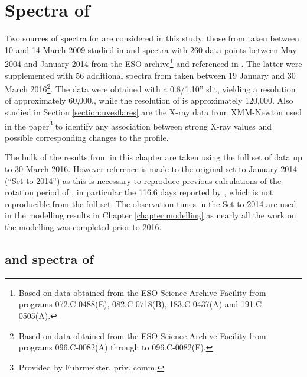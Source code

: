 \chapter{Spectra of \prox}
\protect\label{chapter:proxima}

Two sources of spectra for {\prox} are considered in this study, those from {\uves} taken between 10 and 14 March 2009
studied in \citet{fuhrmeister11} and {\harps} spectra with 260 data points between May 2004 and January 2014 from the
ESO archive\footnote{Based on data obtained from the ESO Science Archive Facility from programs 072.C-0488(E),
  082.C-0718(B), 183.C-0437(A) and 191.C-0505(A).} and referenced in \citet[Table 3]{suarezmascareno15}. The latter were
supplemented with 56 additional spectra from {\harps} taken between 19 January and 30 March 2016\footnote{Based on data obtained
  from the ESO Science Archive Facility from programs 096.C-0082(A) through to 096.C-0082(F).}. The {\uves} data were
obtained with a 0.8/1.10'' slit, yielding a resolution of approximately 60,000., while the resolution of {\harps} is
approximately 120,000. Also studied in Section \ref{section:uvesflares} are the X-ray data from XMM-Newton used in the
\citet{fuhrmeister11} paper\footnote{Provided by Fuhrmeister, priv. comm.} to identify any association between strong
X-ray values and possible corresponding changes to the {\ha} profile.

The bulk of the results from {\harps} in this chapter are taken using the full set of data up to 30 March 2016. However
reference is made to the original set to January 2014 (``Set to 2014'') as this is necessary to reproduce previous
calculations of the rotation period of \prox, in particular the 116.6 days reported by \citet[Table
3]{suarezmascareno15}, which is not reproducible from the full set. The observation times in the Set to 2014 are used in
the modelling results in Chapter \ref{chapter:modelling} as nearly all the work on the modelling was completed prior to
2016.

\section{{\harps} and {\uves} spectra of \prox}

